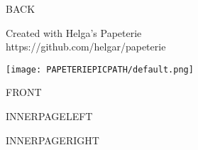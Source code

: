 \documentclass[a5paper,landscape]{scrartcl}
\begin{document}
\begin{multicols}{2}

\begin{center}
\vspace*{\fill}
BACK
\vspace{2cm}

{\color{grey}\tiny{} Created with Helga's Papeterie\\ https://github.com/helgar/papeterie \par }
\end{center}

\columnbreak

  \begin{center}
    \centering\texttt{[image: PAPETERIEPICPATH/default.png]}

    \vspace{1cm}

    {\huge\calligra FRONT}
  \end{center}

\end{multicols}

\pagebreak

\begin{multicols}{2}

\begin{center}
  {\color{grey}INNERPAGELEFT}
\end{center}

\columnbreak

INNERPAGERIGHT

\end{multicols}
\end{document}

